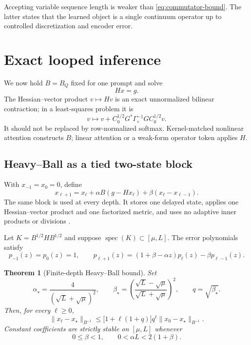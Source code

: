 \documentclass[11pt,a4paper]{article}
\numberwithin{equation}{section}
\newtheorem{theorem}{Theorem}[section]
\theoremstyle{definition}
\theoremstyle{remark}
\newcommand{\spec}{\operatorname{spec}}
\begin{document}
Accepting variable sequence length is weaker than
\eqref{eq:commutator-bound}.  The latter states that the learned object is a
single continuum operator up to controlled discretization and encoder error.

\section{Exact looped inference}
\label{sec:loop}

We now hold $B=B_Q$ fixed for one prompt and solve
\begin{equation}
 Hx=g.
 \label{eq:linear-system}
\end{equation}
The Hessian--vector product $v\mapsto Hv$ is an exact unnormalized bilinear
contraction; in a least-squares problem it is
\[
 v\longmapsto v+C_0^{1/2}G^*\Gamma_\varepsilon^{-1}GC_0^{1/2}v.
\]
It should not be replaced by row-normalized softmax.  Kernel-matched nonlinear
attention constructs $B$; linear attention or a weak-form operator token
applies $H$.

\subsection{Heavy--Ball as a tied two-state block}

With $x_{-1}=x_0=0$, define
\begin{equation}
 x_{\ell+1}=x_\ell+\alpha B(g-Hx_\ell)
 +\beta(x_\ell-x_{\ell-1}).
 \label{eq:heavy-ball}
\end{equation}
The same block is used at every depth.  It stores one delayed state, applies
one Hessian--vector product and one factorized metric, and uses no adaptive
inner products or divisions \citep{polyak1964some}.

Let $K=B^{1/2}HB^{1/2}$ and suppose $\spec(K)\subset[\mu,L]$.  The error
polynomials satisfy
\begin{equation}
 p_{-1}(z)=p_0(z)=1,
 \qquad
 p_{\ell+1}(z)=(1+\beta-\alpha z)p_\ell(z)-\beta p_{\ell-1}(z).
 \label{eq:hb-polynomial}
\end{equation}

\begin{theorem}[Finite-depth Heavy--Ball bound]
\label{thm:hb}
Set
\begin{equation}
 \alpha_\star=\frac{4}{(\sqrt L+\sqrt\mu)^2},\qquad
 \beta_\star=\left(\frac{\sqrt L-\sqrt\mu}
 {\sqrt L+\sqrt\mu}\right)^2,
 \qquad
 q=\sqrt{\beta_\star}.
 \label{eq:hb-coefficients}
\end{equation}
Then, for every $\ell\ge0$,
\begin{equation}
 \|x_\ell-x_\star\|_{B^{-1}}
 \le \bigl[1+\ell(1+q)\bigr]q^\ell
 \|x_0-x_\star\|_{B^{-1}}.
 \label{eq:hb-bound}
\end{equation}
Constant coefficients are strictly stable on $[\mu,L]$ whenever
\begin{equation}
 0\le\beta<1,
 \qquad 0<\alpha L<2(1+\beta).
 \label{eq:jury}
\end{equation}
\end{theorem}
\end{document}
